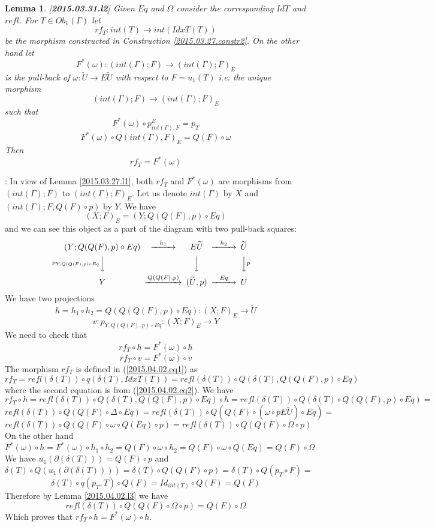 \documentclass[12pt]{article}
\newenvironment{myproof}{{\bf Proof}:}{\vskip 5mm }
\newtheorem{lemma}[proposition]{Lemma}
\newcommand{\llabel}[1]{\label{#1}[{\bf #1}]}
\newcommand{\sr}{\rightarrow}
\newcommand{\wt}{\widetilde}
\begin{document}
\begin{lemma}
\llabel{2015.03.31.l2}
Given $Eq$ and $\Omega$ consider the corresponding $IdT$ and $refl$. For $T\in Ob_1(\Gamma)$ let %
$$rf_T:int(T)\sr int(IdxT(T))$$
%
be the morphism constructed in Construction \ref{2015.03.27.constr2}. On the other hand let 
%
$$F^*(\omega):(int(\Gamma);F)\sr (int(\Gamma);F)_{E}$$
%
is the pull-back of $\omega:\wt{U}\sr E\wt{U}$ with respect to $F=u_1(T)$ i.e. the unique morphism 
%
$$(int(\Gamma);F)\sr (int(\Gamma);F)_{E}$$
%
such that 
%
$$F^*(\omega)\circ p^{E}_{int(\Gamma),F}=p_{T}$$
$$F^*(\omega)\circ Q(int(\Gamma),F)_{E}=Q(F)\circ \omega$$
%
Then 
%
$$rf_T=F^*(\omega)$$
%
\end{lemma}
%
\begin{myproof}
In view of Lemma \ref{2015.03.27.l1}, both $rf_T$ and $F^*(\omega)$ are morphisms from $(int(\Gamma);F)$ to $(int(\Gamma);F)_{E}$. Let us denote $int(\Gamma)$ by $X$ and $(int(\Gamma);F,Q(F)\circ p)$ by $Y$. We have
%
$$(X;F)_{E}=(Y;Q(Q(F),p)\circ Eq)$$
%
and we can see this object as a part of the diagram with two pull-back squares:
%
$$
\begin{CD}
(Y;Q(Q(F),p)\circ Eq) @>h_1>> E\wt{U} @>h_2>> \wt{U}\\
@Vp_{Y, Q(Q(F),p)\circ Eq}VV @VVV @VVpV\\
Y @>Q(Q(F),p)>> (\wt{U},p) @>Eq>> U
\end{CD}
$$
%
We have two projections
%
$$h=h_1\circ h_2=Q(Q(Q(F),p)\circ Eq):(X;F)_{E}\sr \wt{U}$$
$$v:p_{Y,Q(Q(F),p)\circ Eq}:(X;F)_{E} \sr Y$$
%
We need to check that
%
$$rf_T\circ h=F^*(\omega)\circ h$$
$$rf_T\circ v =F^*(\omega)\circ v$$
%
The morphism $rf_T$ is defined in (\ref{2015.04.02.eq1}) as 
%
$$rf_T=refl(\delta(T))\circ q(\delta(T),IdxT(T))=refl(\delta(T))\circ Q(\delta(T),Q(Q(F),p)\circ Eq)$$
%
where the second equation is from (\ref{2015.04.02.eq2}).
%
We have 
%
$$rf_T\circ h = refl(\delta(T))\circ Q(\delta(T),Q(Q(F),p)\circ Eq)\circ h=refl(\delta(T))\circ Q(\delta(T)\circ Q(Q(F),p)\circ Eq)=$$$$refl(\delta(T))\circ Q(Q(F)\circ \Delta\circ Eq)=refl(\delta(T))\circ Q(Q(F)\circ (\omega\circ pE\wt{U})\circ Eq)=$$
$$refl(\delta(T))\circ Q(Q(F)\circ \omega\circ Q(Eq)\circ p)=refl(\delta(T))\circ Q(Q(F)\circ \Omega\circ p)$$
%
On the other hand
%
$$F^*(\omega)\circ h=F^*(\omega)\circ h_1\circ h_2=Q(F)\circ \omega\circ h_2=Q(F)\circ \omega\circ Q(Eq)=Q(F)\circ \Omega$$
%
We have $u_1(\partial(\delta(T)))=Q(F)\circ p$ and 
%
$$\delta(T)\circ Q(u_1(\partial(\delta(T))))=\delta(T)\circ Q(Q(F)\circ p)= \delta(T)\circ Q(p_T\circ F)=$$
$$\delta(T)\circ q(p_T,T)\circ Q(F)=Id_{int(T)}\circ Q(F)=Q(F)$$
%
Therefore by Lemma \ref{2015.04.02.l3} we have
%
$$refl(\delta(T))\circ Q(Q(F)\circ \Omega\circ p)=Q(F)\circ \Omega$$
%
Which proves that $rf_T\circ h=F^*(\omega)\circ h$. 


\end{myproof}
\end{document}
